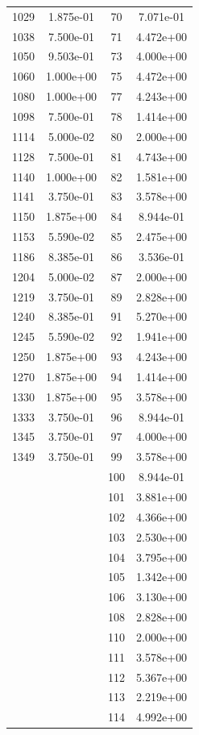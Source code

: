 \documentclass[12pt]{article}
\begin{document}
\begin{longtable}{@{}cccc@{}}
1029 & 1.875e-01 & 70 & 7.071e-01 \\
1038 & 7.500e-01 & 71 & 4.472e+00 \\
1050 & 9.503e-01 & 73 & 4.000e+00 \\
1060 & 1.000e+00 & 75 & 4.472e+00 \\
1080 & 1.000e+00 & 77 & 4.243e+00 \\
1098 & 7.500e-01 & 78 & 1.414e+00 \\
1114 & 5.000e-02 & 80 & 2.000e+00 \\
1128 & 7.500e-01 & 81 & 4.743e+00 \\
1140 & 1.000e+00 & 82 & 1.581e+00 \\
1141 & 3.750e-01 & 83 & 3.578e+00 \\
1150 & 1.875e+00 & 84 & 8.944e-01 \\
1153 & 5.590e-02 & 85 & 2.475e+00 \\
1186 & 8.385e-01 & 86 & 3.536e-01 \\
1204 & 5.000e-02 & 87 & 2.000e+00 \\
1219 & 3.750e-01 & 89 & 2.828e+00 \\
1240 & 8.385e-01 & 91 & 5.270e+00 \\
1245 & 5.590e-02 & 92 & 1.941e+00 \\
1250 & 1.875e+00 & 93 & 4.243e+00 \\
1270 & 1.875e+00 & 94 & 1.414e+00 \\
1330 & 1.875e+00 & 95 & 3.578e+00 \\
1333 & 3.750e-01 & 96 & 8.944e-01 \\
1345 & 3.750e-01 & 97 & 4.000e+00 \\
1349 & 3.750e-01 & 99 & 3.578e+00 \\
 &  & 100 & 8.944e-01 \\
 &  & 101 & 3.881e+00 \\
 &  & 102 & 4.366e+00 \\
 &  & 103 & 2.530e+00 \\
 &  & 104 & 3.795e+00 \\
 &  & 105 & 1.342e+00 \\
 &  & 106 & 3.130e+00 \\
 &  & 108 & 2.828e+00 \\
 &  & 110 & 2.000e+00 \\
 &  & 111 & 3.578e+00 \\
 &  & 112 & 5.367e+00 \\
 &  & 113 & 2.219e+00 \\
 &  & 114 & 4.992e+00 \\

\end{longtable}
\end{document}
